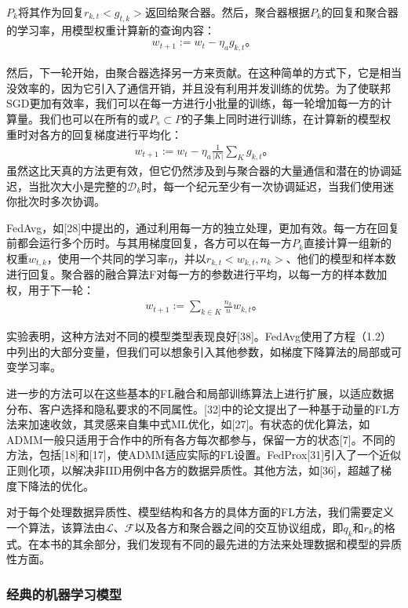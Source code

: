 $P_{k}$将其作为回复$r_{k, t}<g_{t,k}>$返回给聚合器。然后，聚合器根据$P_{k}$的回复和聚合器的学习率，用模型权重计算新的查询内容：
\begin{align}
	w_{t+1} := w_{t} - \eta_{a}g_{k, t}。
\end{align}

然后，下一轮开始，由聚合器选择另一方来贡献。在这种简单的方式下，它是相当没效率的，因为它引入了通信开销，并且没有利用并发训练的优势。为了使联邦SGD更加有效率，我们可以在每一方进行小批量的训练，每一轮增加每一方的计算量。我们也可以在所有的或$P_{s} \subset P$的子集上同时进行训练，在计算新的模型权重时对各方的回复梯度进行平均化：
\begin{align}
	w_{t+1} := w_{t} - \eta_{a}\frac{1}{|K|}\sum_{K}g_{k, t}。
\end{align}
虽然这比天真的方法更有效，但它仍然涉及到与聚合器的大量通信和潜在的协调延迟，当批次大小是完整的$\mathcal{D}_{k}$时，每一个纪元至少有一次协调延迟，当我们使用迷你批次时多次协调。

FedAvg，如[28]中提出的，通过利用每一方的独立处理，更加有效。每一方在回复前都会运行多个历时。与其用梯度回复，各方可以在每一方$P_{k}$直接计算一组新的权重$w_{t,k}$，使用一个共同的学习率$\eta$，并以$r_{k,t}<w_{k,t}, n_{k}>$、他们的模型和样本数进行回复。聚合器的融合算法F对每一方的参数进行平均，以每一方的样本数加权，用于下一轮：
\begin{align}
	w_{t+1} := \sum_{k \in K}\frac{n_{k}}{n}w_{k, t}。
\end{align}

实验表明，这种方法对不同的模型类型表现良好[38]。FedAvg使用了方程（1.2）中列出的大部分变量，但我们可以想象引入其他参数，如梯度下降算法的局部或可变学习率。

进一步的方法可以在这些基本的FL融合和局部训练算法上进行扩展，以适应数据分布、客户选择和隐私要求的不同属性。[32]中的论文提出了一种基于动量的FL方法来加速收敛，其灵感来自集中式ML优化，如[27]。有状态的优化算法，如ADMM一般只适用于合作中的所有各方每次都参与，保留一方的状态[7]。不同的方法，包括[18]和[17]，使ADMM适应实际的FL设置。FedProx[31]引入了一个近似正则化项，以解决非IID用例中各方的数据异质性。其他方法，如[36]，超越了梯度下降法的优化。

对于每个处理数据异质性、模型结构和各方的具体方面的FL方法，我们需要定义一个算法，该算法由$\mathcal{L}$、$\mathcal{F}$以及各方和聚合器之间的交互协议组成，即$q_{k}$和$r_{k}$的格式。在本书的其余部分，我们发现有不同的最先进的方法来处理数据和模型的异质性方面。

\subsubsection{经典的机器学习模型}

